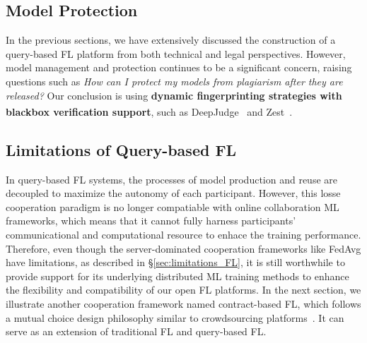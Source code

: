 \subsection{Model Protection}
\label{sec:ip_protect}
In the previous sections, we have extensively discussed the construction of a query-based FL platform from both technical and legal perspectives. 
However, model management and protection continues to be a significant concern, raising questions such as \textit{How can I protect my models from plagiarism after they are released?}
Our conclusion is using \textbf{dynamic fingerprinting strategies with blackbox verification support}\textsuperscript{}, such as DeepJudge~\cite{chen2022copy} and Zest~\cite{jia2022zest}.%

\subsection{Limitations of Query-based FL}
\label{sec:limitations_qbfl}
In query-based FL systems, the processes of model production and reuse are decoupled to maximize the autonomy of each participant. 
However, this losse cooperation paradigm is no longer compatiable with online collaboration ML frameworks, which means that it cannot fully harness participants' communicational and computational resource to enhace the training performance.
Therefore, even though the server-dominated cooperation frameworks like FedAvg have limitations, as described in \S\ref{sec:limitations_FL}, it is still worthwhile to provide support for its underlying distributed ML training methods to enhance the flexibility and compatibility of our open FL platforms.
In the next section, we illustrate another cooperation framework named contract-based FL, which follows a mutual choice design philosophy similar to crowdsourcing platforms~\cite{vaughan2018making}.
It can serve as an extension of traditional FL and query-based FL.


